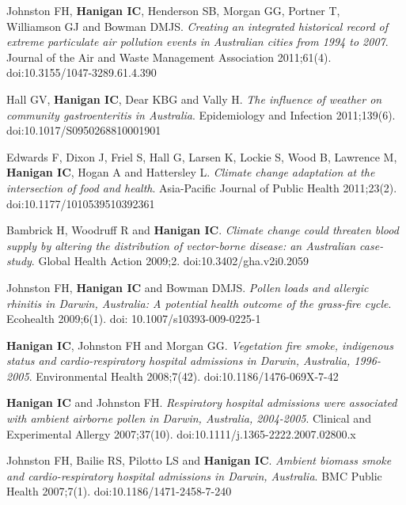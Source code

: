 \documentclass[a4paper,11pt]{article}
\begin{document}
\begin{revnumerate}
\item Johnston FH, \textbf{Hanigan IC}, Henderson SB, Morgan GG, Portner T, \\
 Williamson GJ and Bowman DMJS. \emph{Creating an integrated historical record of extreme particulate air pollution events in Australian cities from 1994 to 2007}. Journal of the Air and Waste Management Association 2011;61(4). doi:10.3155/1047-3289.61.4.390

\item Hall GV, \textbf{Hanigan IC}, Dear KBG and Vally H. \emph{The influence of weather on community gastroenteritis in Australia}. Epidemiology and Infection 2011;139(6). doi:10.1017/S0950268810001901

\item Edwards F, Dixon J, Friel S, Hall G, Larsen K, Lockie S, Wood B, Lawrence M, \textbf{Hanigan IC}, Hogan A and Hattersley L. \emph{Climate change adaptation at the intersection of food and health}. Asia-Pacific Journal of Public Health 2011;23(2). doi:10.1177/1010539510392361 

\item Bambrick H, Woodruff R and \textbf{Hanigan IC}. \emph{Climate change could threaten blood supply by altering the distribution of vector-borne disease: an Australian case-study}.  Global Health Action 2009;2. doi:10.3402/gha.v2i0.2059

\item Johnston FH, \textbf{Hanigan IC} and Bowman DMJS. \emph{Pollen loads and allergic rhinitis in Darwin, Australia: A potential health outcome of the grass-fire cycle}. Ecohealth 2009;6(1). doi: 10.1007/s10393-009-0225-1

\item \textbf{Hanigan IC}, Johnston FH and Morgan GG. \emph{Vegetation fire smoke, indigenous status and cardio-respiratory hospital admissions in Darwin, Australia, 1996-2005}. Environmental Health 2008;7(42). doi:10.1186/1476-069X-7-42

\item \textbf{Hanigan IC} and Johnston FH. \emph{Respiratory hospital admissions were associated with ambient airborne pollen in Darwin, Australia, 2004-2005}. Clinical and Experimental Allergy 2007;37(10). doi:10.1111/j.1365-2222.2007.02800.x

\item Johnston FH, Bailie RS, Pilotto LS and \textbf{Hanigan IC}. \emph{Ambient biomass smoke and cardio-respiratory hospital admissions in Darwin, Australia}. BMC Public Health 2007;7(1). doi:10.1186/1471-2458-7-240


\end{revnumerate}
\end{document}
